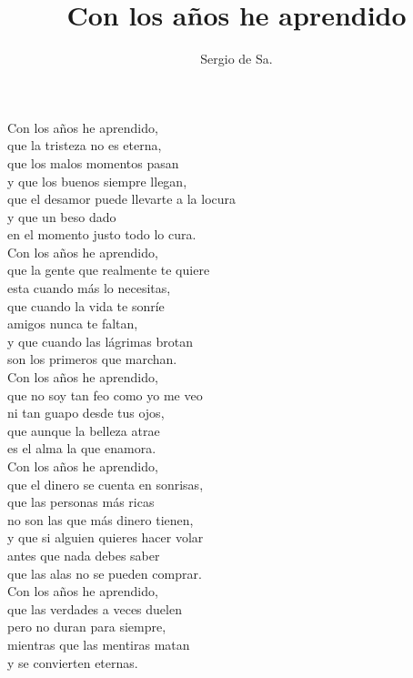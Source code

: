 \documentclass[12pt,twocolumn,oneside]{article}
\author{Sergio de Sa.}
\title{Con los a\~nos he aprendido}
\begin{document}
\maketitle
Con los a\~nos he aprendido,\\
que la tristeza no es eterna,\\
que los malos momentos pasan\\
y que los buenos siempre llegan,\\
que el desamor puede llevarte a la locura\\
y que un beso dado\\
en el momento justo todo lo cura.\\

Con los a\~nos he aprendido,\\
que la gente que realmente te quiere\\
esta cuando m\'as lo necesitas,\\
que cuando la vida te sonr\'ie\\
amigos nunca te faltan,\\
y que cuando las l\'agrimas brotan\\
son los primeros que marchan.\\

Con los a\~nos he aprendido,\\
que no soy tan feo como yo me veo\\
ni tan guapo desde tus ojos,\\
que aunque la belleza atrae\\
es el alma la que enamora.\\

Con los a\~nos he aprendido,\\
que el dinero se cuenta en sonrisas,\\
que las personas m\'as ricas\\
no son las que m\'as dinero tienen,\\
y que si alguien quieres hacer volar\\
antes que nada debes saber\\
que las alas no se pueden comprar.\\

Con los a\~nos he aprendido,\\
que las verdades a veces duelen\\
pero no duran para siempre,\\
mientras que las mentiras matan\\
y se convierten eternas.\\
\end{document}
